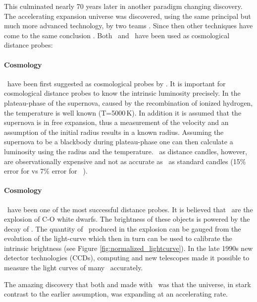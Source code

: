 This culminated nearly 70 years later in another paradigm changing discovery. The accelerating expansion universe was discovered, using the same principal but much more advanced technology, by two teams \citep{1998AJ....116.1009R}. 
Since then other techniques have come to the same conclusion \cite[e.g.][]{2011MNRAS.tmp..951B}. Both \sneia\ and \snii\ have been used as cosmological distance probes:

\paragraph{ Cosmology}
\sniip\ have been first suggested as cosmological probes by \citet{1974ApJ...193...27K}. It is important for cosmological distance probes to know the intrinsic luminosity precisely. In the plateau-phase of the supernova, caused by the recombination of ionized hydrogen,  the temperature is well known (T=5000\,K). In addition it is assumed that the supernova is in free expansion, thus a measurement of the velocity and an assumption of the initial radius results in a known radius. Assuming the supernova to be a blackbody during plateau-phase one can then calculate a luminosity using the radius and the temperature. \sniip\ as distance candles, however, are observationally expensive and not as accurate as \snia\ as standard candles (15\% error for \snii  vs 7\% error for \snia\ \citep{2006ApJ...645..841N}).

\paragraph{ Cosmology}
\sneia\ have been one of the most successful distance probes. It is believed that \sneia\ are the explosion of C-O white dwarfs. The brightness of these objects is powered by the decay of \Ni. The quantity of \Ni\ produced in the explosion can be gauged from the evolution of the light-curve which then in turn can be used to calibrate the intrinsic brightness (see Figure \ref{fig:normalized_lightcurve}).
In the late 1990s new detector technologies (CCDs), computing and new telescopes made it possible to measure the light curves of many \sneia\ accurately. 

The amazing discovery that both \citet{1998AJ....116.1009R} and \citet{1999ApJ...517..565P} made with \sneia\ was that the universe, in stark contrast to the earlier assumption, was expanding at an accelerating rate. 

